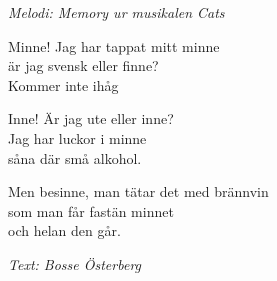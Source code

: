 {\footnotesize\textit{Melodi: Memory ur musikalen Cats}}\par
\vspace{10pt}
Minne! Jag har tappat mitt minne\\
är jag svensk eller finne?\\
Kommer inte ihåg\par
\vspace{10pt}
Inne! Är jag ute eller inne?\\
Jag har luckor i minne\\
såna där små alkohol.\par
\vspace{10pt}
Men besinne, man tätar det med brännvin \\
som man får fastän minnet \\
och helan den går.\par
\vspace{10pt}
{\footnotesize\textit{Text: Bosse Österberg}}
